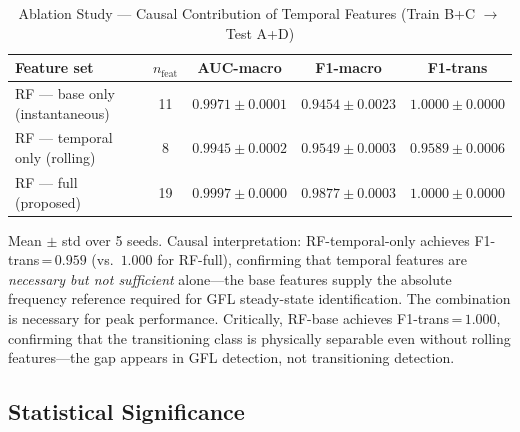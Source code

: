 \documentclass[journal]{IEEEtran}
\begin{document}
\begin{table}[!t]
\renewcommand{\arraystretch}{1.25}
\caption{Ablation Study --- Causal Contribution of Temporal Features (Train B+C $\rightarrow$ Test A+D)}
\label{tab:ablation}
\centering
\begin{tabular}{@{}lcccc@{}}
\toprule
Feature set & $n_\text{feat}$ & AUC-macro & F1-macro & F1-trans \\
\midrule
RF --- base only (instantaneous)  & 11 & $0.9971\pm0.0001$ & $0.9454\pm0.0023$ & $1.0000\pm0.0000$ \\
RF --- temporal only (rolling)    &  8 & $0.9945\pm0.0002$ & $0.9549\pm0.0003$ & $0.9589\pm0.0006$ \\
RF --- full (proposed)            & 19 & $\mathbf{0.9997\pm0.0000}$ & $\mathbf{0.9877\pm0.0003}$ & $\mathbf{1.0000\pm0.0000}$ \\
\bottomrule
\end{tabular}
\begin{tablenotes}
\small
\item Mean $\pm$ std over 5 seeds.
      Causal interpretation: RF-temporal-only achieves F1-trans\,=\,$0.959$
      (vs.\ $1.000$ for RF-full), confirming that temporal features are
      \emph{necessary but not sufficient} alone---the base features supply
      the absolute frequency reference required for GFL steady-state
      identification. The combination is necessary for peak performance.
      Critically, RF-base achieves F1-trans\,=\,$1.000$, confirming that
      the transitioning class is physically separable even without rolling
      features---the gap appears in GFL detection, not transitioning detection.
\end{tablenotes}
\end{table}

\subsection{Statistical Significance}
\end{document}

